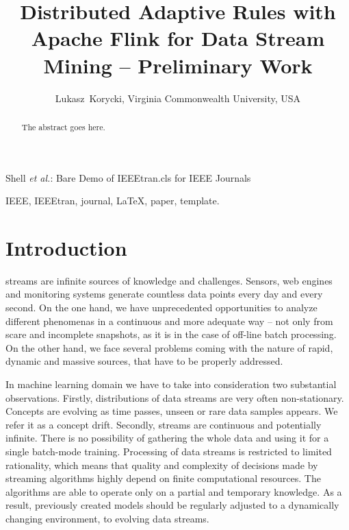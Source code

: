 \documentclass[journal]{IEEEtran}
\begin{document}
\title{Distributed Adaptive Rules with Apache Flink for Data Stream Mining -- Preliminary Work}

\author{Lukasz~Korycki, Virginia Commonwealth University, USA}%

%
{Shell \MakeLowercase{\textit{et al.}}: Bare Demo of IEEEtran.cls for IEEE Journals}

\maketitle

\begin{abstract}
	The abstract goes here.
\end{abstract}

\begin{IEEEkeywords}
	IEEE, IEEEtran, journal, \LaTeX, paper, template.
\end{IEEEkeywords}

\IEEEpeerreviewmaketitle

\section{Introduction}

 streams are infinite sources of knowledge and challenges. Sensors, web engines and monitoring systems generate countless data points every day and every second. On the one hand, we have unprecedented opportunities to analyze different phenomenas in a continuous and more adequate way -- not only from scare and incomplete snapshots, as it is in the case of off-line batch processing. On the other hand, we face several problems coming with the nature of rapid, dynamic and massive sources, that have to be properly addressed. 

In machine learning domain we have to take into consideration two substantial observations. Firstly, distributions of data streams are very often non-stationary. Concepts are evolving as time passes, unseen or rare data samples appears. We refer it as a concept drift. Secondly, streams are continuous and potentially infinite. There is no possibility of gathering the whole data and using it for a single batch-mode training. Processing of data streams is restricted to limited rationality, which means that quality and complexity of decisions made by streaming algorithms highly depend on finite computational resources. The algorithms are able to operate only on a partial and temporary knowledge. As a result, previously created models should be regularly adjusted to a dynamically changing environment, to evolving data streams.
\end{document}
